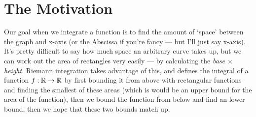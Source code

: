 \section{The Motivation}

Our goal when we integrate a function is to find the amount of `space' between the graph and x-axis (or the Abscissa if you're fancy --- but I'll just say x-axis). It's pretty difficult to say how much space an arbitrary curve takes up, but we can work out the area of rectangles very easily --- by calculating the {\em base $\times$ height}. Riemann integration takes advantage of this, and defines the integral of a function $f:\mathbb{R} \rightarrow \mathbb{R}$ by first bounding it from above with rectangular functions and finding the smallest of these areas (which is would be an upper bound for the area of the function), then we bound the function from below and find an lower bound, then we hope that these two bounds match up. 

